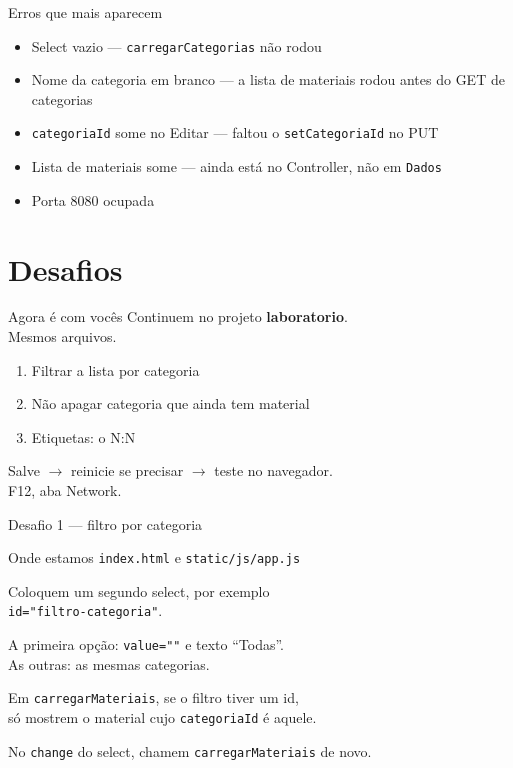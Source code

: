 \documentclass[aspectratio=169,11pt]{beamer}
\newcommand{\onde}[1]{%
  \begin{block}{Onde estamos}
    #1
  \end{block}
}
\begin{document}
\begin{frame}{Erros que mais aparecem}
  \begin{itemize}
    \item Select vazio --- \texttt{carregarCategorias} não rodou
    \item Nome da categoria em branco --- a lista de materiais
          rodou antes do GET de categorias
    \item \texttt{categoriaId} some no Editar --- faltou o
          \texttt{setCategoriaId} no PUT
    \item Lista de materiais some --- ainda está no Controller,
          não em \texttt{Dados}
    \item Porta 8080 ocupada
  \end{itemize}
\end{frame}

\section{Desafios}

\begin{frame}{Agora é com vocês}
  Continuem no projeto \textbf{laboratorio}.\\
  Mesmos arquivos.

  \vspace{0.5em}
  \begin{enumerate}
    \item Filtrar a lista por categoria
    \item Não apagar categoria que ainda tem material
    \item Etiquetas: o N:N
  \end{enumerate}

  \vspace{0.5em}
  Salve $\rightarrow$ reinicie se precisar $\rightarrow$ teste no navegador.\\
  F12, aba Network.
\end{frame}

\begin{frame}{Desafio 1 --- filtro por categoria}
  \onde{\texttt{index.html} e \texttt{static/js/app.js}}

  Coloquem um segundo select, por exemplo\\
  \texttt{id="filtro-categoria"}.

  \vspace{0.4em}
  A primeira opção: \texttt{value=""} e texto ``Todas''.\\
  As outras: as mesmas categorias.

  \vspace{0.4em}
  Em \texttt{carregarMateriais}, se o filtro tiver um id,\\
  só mostrem o material cujo \texttt{categoriaId} é aquele.

  \vspace{0.4em}
  No \texttt{change} do select, chamem
  \texttt{carregarMateriais} de novo.
\end{frame}
\end{document}
